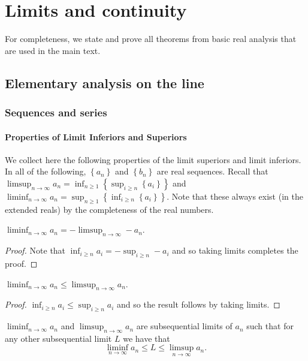 
\chapter{Limits and continuity\label{chap:limitsAndContinuity}}

For completeness, we state and prove all theorems from basic real
analysis that are used in the main text.

\section{Elementary analysis on the line}

\subsection{Sequences and series}

\subsubsection{Properties of Limit Inferiors and Superiors}

We collect here the following properties of the limit superiors and
limit inferiors. In all of the following, $\left\{ a_{n}\right\} $
and $\left\{ b_{n}\right\} $ are real sequences. Recall that $\limsup_{n\to\infty}a_{n}=\inf_{n\geq1}\left\{ \sup_{i\geq n}\left\{ a_{i}\right\} \right\} $
and $\liminf_{n\to\infty}a_{n}=\sup_{n\geq1}\left\{ \inf_{i\geq n}\left\{ a_{i}\right\} \right\} $.
Note that these always exist (in the extended reals) by the completeness
of the real numbers.
\begin{prop}
\label{prop:.limInfNegLimSupNeg}$\liminf_{n\to\infty}a_{n}=-\limsup_{n\to\infty}-a_{n}$.
\end{prop}

\begin{proof}
Note that $\inf_{i\geq n}a_{i}=-\sup_{i\geq n}-a_{i}$ and so taking
limits completes the proof.
\end{proof}
\begin{prop}
\label{prop:limSupDominatesLimInf}$\liminf_{n\to\infty}a_{n}\leq\limsup_{n\to\infty}a_{n}$.
\end{prop}

\begin{proof}
$\inf_{i\geq n}a_{i}\leq\sup_{i\geq n}a_{i}$ and so the result follows
by taking limits.
\end{proof}
\begin{prop}
\label{prop:limSupSubsequential}$\liminf_{n\to\infty}a_{n}$ and
$\limsup_{n\to\infty}a_{n}$ are subsequential limits of $a_{n}$
such that for any other subsequential limit $L$ we have that 
\[
\liminf_{n\to\infty}a_{n}\leq L\leq\limsup_{n\to\infty}a_{n}.
\]
\end{prop}

